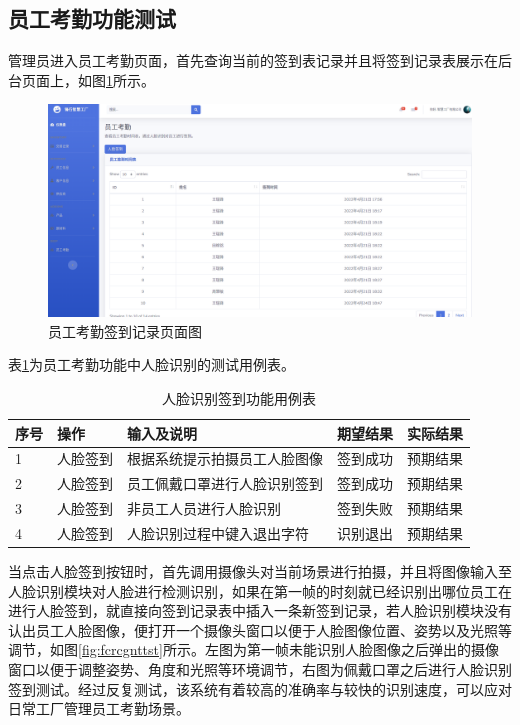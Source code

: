 \subsection{员工考勤功能测试}

管理员进入员工考勤页面，首先查询当前的签到表记录并且将签到记录表展示在后台页面上，如图\ref{fig:empleatdc}所示。

\begin{figure}[H]
    \centering
    \includegraphics[width=.75\textwidth]{figures/6employeeattendance.png}
    \caption{员工考勤签到记录页面图}
    \label{fig:empleatdc}
\end{figure}

表\ref{tab:fcrcgnts}为员工考勤功能中人脸识别的测试用例表。

\begin{table}[H]
    \centering
    \caption{人脸识别签到功能用例表}
    \label{tab:fcrcgnts}
    \begin{tabularx}{.95\textwidth}{p{2em}<{\centering}X<{\centering}p{16em}<{\centering}X<{\centering}X<{\centering}}
        \toprule
        序号 & 操作 & 输入及说明 & 期望结果 & 实际结果 \\
        \midrule
        1 & 人脸签到 & 根据系统提示拍摄员工人脸图像 & 签到成功 & 预期结果 \\
        2 & 人脸签到 & 员工佩戴口罩进行人脸识别签到 & 签到成功 & 预期结果 \\
        3 & 人脸签到 & 非员工人员进行人脸识别 & 签到失败 & 预期结果 \\
        4 & 人脸签到 & 人脸识别过程中键入退出字符 & 识别退出 & 预期结果 \\
        \bottomrule
    \end{tabularx}
\end{table}

当点击人脸签到按钮时，首先调用摄像头对当前场景进行拍摄，并且将图像输入至人脸识别模块对人脸进行检测识别，如果在第一帧的时刻就已经识别出哪位员工在进行人脸签到，就直接向签到记录表中插入一条新签到记录，若人脸识别模块没有认出员工人脸图像，便打开一个摄像头窗口以便于人脸图像位置、姿势以及光照等调节，如图\ref{fig:fcrcgnttst}所示。左图为第一帧未能识别人脸图像之后弹出的摄像窗口以便于调整姿势、角度和光照等环境调节，右图为佩戴口罩之后进行人脸识别签到测试。经过反复测试，该系统有着较高的准确率与较快的识别速度，可以应对日常工厂管理员工考勤场景。

